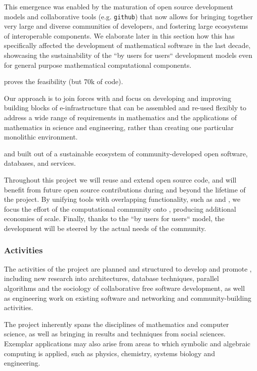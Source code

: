 This emergence was enabled by the maturation of open source
development models and collaborative tools (e.g. \texttt{github}) that
now allows for bringing together very large and diverse communities of
developers, and fostering large ecosystems of interoperable
components. We elaborate later in this section how this has
specifically affected the development of mathematical software in the
last decade, showcasing the sustainability of the ``by users for
users`` development models even for general purpose mathematical
computational components.

\SMC proves the feasibility (but 70k of code).


\begin{frame}
  Our approach is to join forces with \Jupyter and focus on developing
  and improving building blocks of e-infrastructure that can be
  assembled and re-used flexibly to address a wide range of
  requirements in mathematics and the applications of mathematics in
  science and engineering, rather than creating one particular
  monolithic environment.

  and built out of a sustainable ecosystem
  of %
  community-developed open software, databases, and services.
\end{frame}

Throughout this project we will reuse and extend open source code, and
\TheProject will benefit from future open source contributions during
and beyond the lifetime of the project. By unifying tools with
overlapping functionality, such as \Jupyter and \Sage, we focus the
effort of the computational community onto \TheProject, producing
additional economies of scale. Finally, thanks to the ``by users for
users`` model, the development will be steered by the actual needs of
the community.


\subsubsection{Activities}

The activities of the project are planned and structured to develop
and promote \TheProject, including new research into
architectures, database techniques, parallel algorithms and the
sociology of collaborative free software development, as well as
engineering work on existing software and networking and
community-building activities.

The project inherently spans the disciplines of mathematics and
computer science, as well as bringing in results and techniques from
social sciences. Exemplar applications may also arise from areas to
which symbolic and algebraic computing is applied, such as physics,
chemistry, systems biology and engineering.


